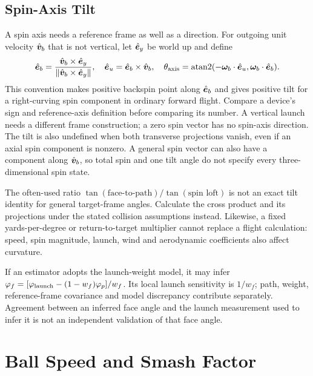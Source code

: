 \subsection{Spin-Axis Tilt}

A spin axis needs a reference frame as well as a direction.
For outgoing unit velocity $\hat{\bm{v}}_b$ that is not vertical, let $\hat{\bm{e}}_y$ be world up and define
\begin{equation}
\label{eq:axistilt}
\hat{\bm{e}}_b=\frac{\hat{\bm{v}}_b\times\hat{\bm{e}}_y}
 {\|\hat{\bm{v}}_b\times\hat{\bm{e}}_y\|},\quad
\hat{\bm{e}}_u=\hat{\bm{e}}_b\times\hat{\bm{v}}_b,\quad
\theta_{\rm axis}=\operatorname{atan2}
 (-\boldsymbol\omega_b\cdot\hat{\bm{e}}_u,
   \boldsymbol\omega_b\cdot\hat{\bm{e}}_b).
\end{equation}
This convention makes positive backspin point along $\hat{\bm{e}}_b$ and gives positive tilt for a right-curving spin component in ordinary forward flight.
Compare a device's sign and reference-axis definition before comparing its number.
A vertical launch needs a different frame construction; a zero spin vector has no spin-axis direction.
The tilt is also undefined when both transverse projections vanish, even if an axial spin component is nonzero.
A general spin vector can also have a component along $\hat{\bm{v}}_b$, so total spin and one tilt angle do not specify every three-dimensional spin state.

The often-used ratio $\tan(\text{face-to-path})/\tan(\text{spin loft})$ is not an exact tilt identity for general target-frame angles.
Calculate the cross product and its projections under the stated collision assumptions instead.
Likewise, a fixed yards-per-degree or return-to-target multiplier cannot replace a flight calculation: speed, spin magnitude, launch, wind and aerodynamic coefficients also affect curvature.

\begin{implication}
If an estimator adopts the launch-weight model, it may infer
$\varphi_f=[\varphi_{\rm launch}-(1-w_f)\varphi_p]/w_f$.
Its local launch sensitivity is $1/w_f$; path, weight, reference-frame covariance and model discrepancy contribute separately.
Agreement between an inferred face angle and the launch measurement used to infer it is not an independent validation of that face angle.
\end{implication}

\section{Ball Speed and Smash Factor}
\label{sec:smash}


